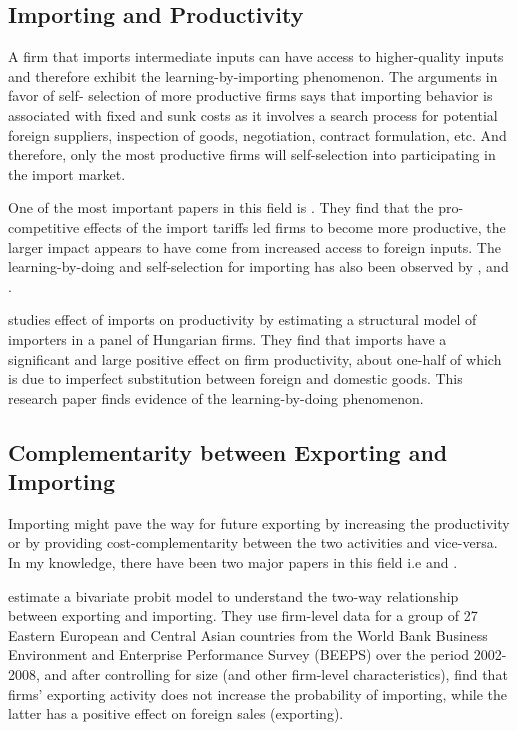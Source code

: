 \documentclass[12pt]{article}
\begin{document}

\subsection*{Importing and Productivity}

A firm that imports intermediate inputs can have access to higher-quality inputs and
therefore exhibit the learning-by-importing phenomenon. The arguments in favor of self-
selection of more productive firms says that importing behavior is associated with fixed and
sunk costs as it involves a search process for potential foreign suppliers, inspection of goods,
negotiation, contract formulation, etc. And therefore, only the most productive firms will
self-selection into participating in the import market.

One of the most important papers in this field
is \textcite{topalova2011trade}. They find that the pro-competitive
effects of the import tariffs led firms to become more
productive, the larger impact appears to have come from 
increased access to foreign inputs. The learning-by-doing and
self-selection for importing has also been observed by
\textcite{muuls2009imports}, and \textcite{kasahara2008does}. 

\textcite{halpern2011imported} studies effect of imports on productivity by estimating a structural
model of importers in a panel of Hungarian firms. They find that imports have
a significant and large positive effect on firm productivity, about one-half of which is due
to imperfect substitution between foreign and domestic goods. This
research paper finds evidence of the learning-by-doing phenomenon. 

\subsection*{Complementarity between Exporting and Importing}

Importing  might pave the way for future
exporting by increasing the productivity or by providing
cost-complementarity between the two activities and vice-versa. 
In my knowledge, there have been two major papers in this field
i.e \textcite{aristei2013firms} and \textcite{kasahara2013productivity}. 

\textcite{aristei2013firms} estimate a bivariate probit model to
understand the two-way relationship between exporting and importing. 
They use  firm-level data for a group of 27 Eastern European and 
Central Asian countries from the World Bank Business Environment 
and Enterprise Performance Survey (BEEPS) over the period 2002-2008, 
and after controlling for size (and other firm-level characteristics),
find that firms’ exporting activity does not increase the
probability of importing, while the latter has a positive effect
 on foreign sales (exporting). 
\end{document}
